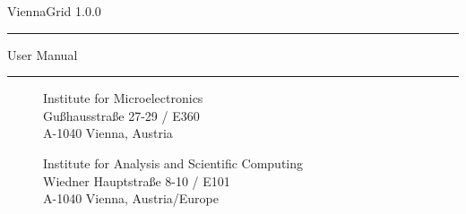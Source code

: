 
\begin{titlepage}

\vspace*{3cm}
\Huge{ViennaGrid 1.0.0} 
\rule[0.0cm]{8.9cm}{0.05cm}
\begin{flushright}
\Large{User Manual}
\end{flushright}

\vspace{11.2cm}
\rule[0.0cm]{16.0cm}{0.05cm}
\begin{figure}[!ht]
   \vspace{-1.0cm}
   \begin{minipage}{2cm}
   \end{minipage}
   \hfill
   \begin{minipage}{9.5cm}
      \begin{flushright}
      \vspace{0.2cm}
      Institute for Microelectronics\\
      Gu\ss hausstra\ss e 27-29 / E360\\
      A-1040 Vienna, Austria\\
      \end{flushright}
      \vspace{0.1cm}
      \begin{flushright}
      Institute for Analysis and Scientific Computing\\
      Wiedner Hauptstra\ss e 8-10 / E101\\
      A-1040 Vienna, Austria/Europe\\
      \end{flushright}
   \end{minipage}   
   \hfill   
   \begin{minipage}{2.6cm}
       \\
      \hspace*{0.3cm}
   \end{minipage}
\end{figure}

\end{titlepage}


